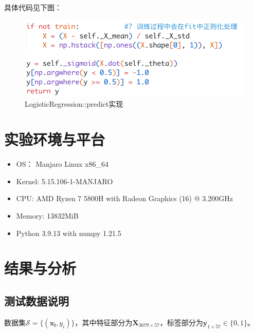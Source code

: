 \documentclass{paper}
\begin{document}
具体代码见下图：
\begin{figure}[H]
    \begin{center}
        \includegraphics[scale = 0.35, frame]{images/lp.png}
    \end{center}
    \caption[short]{LogisticRegression::predict实现}
\end{figure}

\section{实验环境与平台}

\begin{itemize}
    \item OS： Manjaro Linux x86\_64
    \item Kernel: 5.15.106-1-MANJARO
    \item CPU: AMD Ryzen 7 5800H with Radeon Graphics (16) @ 3.200GHz
    \item Memory: 13832MiB
    \item Python 3.9.13 with numpy 1.21.5
\end{itemize}

\section{结果与分析}
\subsection{测试数据说明}

数据集$\mathcal{S}=\{(\mathbf{x_i},y_i)\}$，其中特征部分为$\mathbf{X}_{3679 \times 57}$，标签部分为$\mathbf{y}_{1 \times 57} \in \{0, 1\}$。
\end{document}
